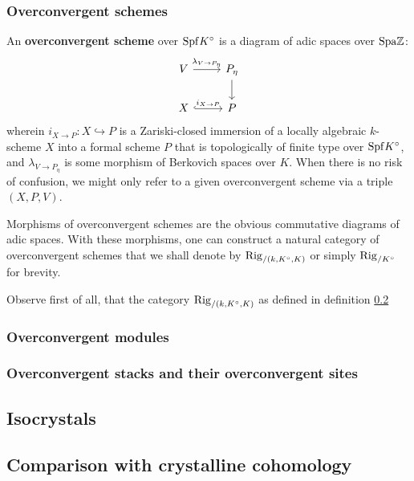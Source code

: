         \subsubsection{Overconvergent schemes}
            \begin{definition} \label{def: overconvergent_schemes}
                An \textbf{overconvergent scheme} over $\mathrm{Spf} K^{\circ}$ is a diagram of adic spaces over $\mathrm{Spa} \mathbb{Z}$:
                    $$
                        \begin{tikzcd}
                        	V & {P_{\eta}} \\
                        	X & P
                        	\arrow["{i_{X \to P}}", hook, from=2-1, to=2-2]
                        	\arrow["{\lambda_{V \to P_{\eta}}}", from=1-1, to=1-2]
                        	\arrow[from=1-2, to=2-2]
                        \end{tikzcd}
                    $$
                wherein $i_{X \to P}: X \hookrightarrow P$ is a Zariski-closed immersion of a locally algebraic $k$-scheme $X$ into a formal scheme $P$ that is topologically of finite type over $\mathrm{Spf} K^{\circ}$, and $\lambda_{V \to P_{\eta}}$ is some morphism of Berkovich spaces over $K$. When there is no risk of confusion, we might only refer to a given overconvergent scheme via a triple $(X, P, V)$. 
                
                Morphisms of overconvergent schemes are the obvious commutative diagrams of adic spaces. With these morphisms, one can construct a natural category of overconvergent schemes that we shall denote by $\mathrm{Rig}_{/(k, K^{\circ}, K)}$ or simply $\mathrm{Rig}_{/K^{\circ}}$ for brevity.
            \end{definition}
            \begin{remark}
                Observe first of all, that the category $\mathrm{Rig}_{/(k, K^{\circ}, K)}$ as defined in definition \ref{}
            \end{remark}
        
        \subsubsection{Overconvergent modules}
        
        \subsubsection{Overconvergent stacks and their overconvergent sites}
    
    \subsection{Isocrystals}
    
    \subsection{Comparison with crystalline cohomology}